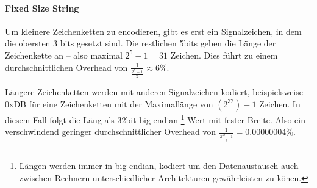 \paragraph{Fixed Size String} Um kleinere Zeichenketten zu encodieren, gibt es erst ein Signalzeichen,
in dem die obersten 3 bits gesetzt sind. Die restlichen 5bits geben die L{\"{a}}nge der Zeichenkette an --
also maximal $2^5 - 1 = 31$ Zeichen. Dies f{\"{u}}hrt zu einem durchschnittlichen Overhead von
$ \frac{1}{\frac{2^5-1}{2}} \approx 6\% $.

L{\"{a}}ngere Zeichenketten werden mit anderen Signalzeichen kodiert, beispielsweise 0xDB f{\"{u}}r eine Zeichenketten mit der Maximall{\"{a}}nge von $(2^{32})-1$ Zeichen.
In diesem Fall folgt die L{\"{a}}ng als 32bit big endian
\footnote{L{\"{a}}ngen werden immer in big-endian, kodiert um den Datenaustausch auch zwischen Rechnern unterschiedlicher Architekturen gew{\"{a}}hrleisten zu k{\"{o}}nen.}
Wert mit fester Breite. Also ein verschwindend geringer durchschnittlicher Overhead von $ \frac{1}{\frac{2^{32}-1}{2}} = 0.00000004\% $.
